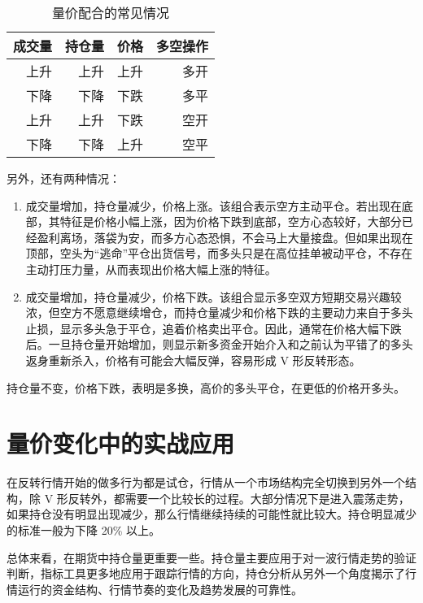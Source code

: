 \begin{table}
    \centering
    \caption{量价配合的常见情况}
    \begin{tabular}{rrrr}
        \hline
        成交量 & 持仓量 & 价格 & 多空操作 \\
        \hline
        上升  & 上升  & 上升 & 多开   \\
        下降  & 下降  & 下跌 & 多平   \\
        上升  & 上升  & 下跌 & 空开   \\
        下降  & 下降  & 上升 & 空平   \\
        \hline
    \end{tabular}
\end{table}

另外，还有两种情况：
\begin{enumerate}
    \item 成交量增加，持仓量减少，价格上涨。该组合表示空方主动平仓。若出现在底部，其特征是价格小幅上涨，因为价格下跌到底部，空方心态较好，大部分已经盈利离场，落袋为安，而多方心态恐惧，不会马上大量接盘。但如果出现在顶部，空头为“逃命”平仓出货信号，而多头只是在高位挂单被动平仓，不存在主动打压力量，从而表现出价格大幅上涨的特征。
    \item 成交量增加，持仓量减少，价格下跌。该组合显示多空双方短期交易兴趣较浓，但空方不愿意继续增仓，而持仓量减少和价格下跌的主要动力来自于多头止损，显示多头急于平仓，追着价格卖出平仓。因此，通常在价格大幅下跌后。一旦持仓量开始增加，则显示新多资金开始介入和之前认为平错了的多头返身重新杀入，价格有可能会大幅反弹，容易形成 V 形反转形态。
\end{enumerate}

持仓量不变，价格下跌，表明是多换，高价的多头平仓，在更低的价格开多头。

\section{量价变化中的实战应用}
在反转行情开始的做多行为都是试仓，行情从一个市场结构完全切换到另外一个结构，除 V 形反转外，都需要一个比较长的过程。大部分情况下是进入震荡走势，如果持仓没有明显出现减少，那么行情继续持续的可能性就比较大。持仓明显减少的标准一般为下降 20\% 以上。

总体来看，在期货中持仓量更重要一些。持仓量主要应用于对一波行情走势的验证判断，指标工具更多地应用于跟踪行情的方向，持仓分析从另外一个角度揭示了行情运行的资金结构、行情节奏的变化及趋势发展的可靠性。

